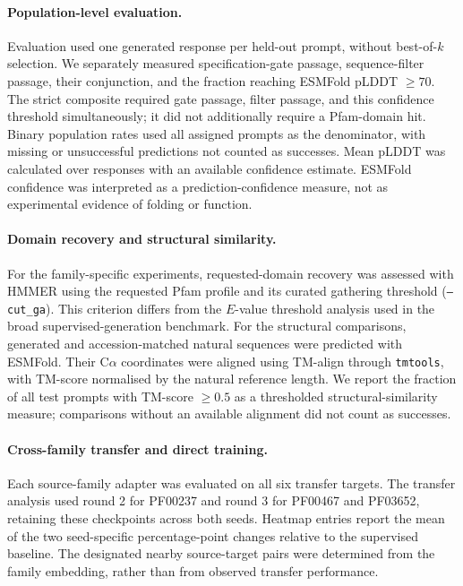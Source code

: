 \documentclass{article} %
\begin{document}
\paragraph{Population-level evaluation.}
Evaluation used one generated response per held-out prompt, without best-of-$k$ selection. We separately measured specification-gate passage, sequence-filter passage, their conjunction, and the fraction reaching ESMFold pLDDT $\geq70$. The strict composite required gate passage, filter passage, and this confidence threshold simultaneously; it did not additionally require a Pfam-domain hit. Binary population rates used all assigned prompts as the denominator, with missing or unsuccessful predictions not counted as successes. Mean pLDDT was calculated over responses with an available confidence estimate. ESMFold confidence was interpreted as a prediction-confidence measure, not as experimental evidence of folding or function.

\paragraph{Domain recovery and structural similarity.}
For the family-specific experiments, requested-domain recovery
was assessed with HMMER using the requested Pfam profile and
its curated gathering threshold (\texttt{--cut\_ga}).
This criterion differs from the $E$-value threshold analysis
used in the broad supervised-generation benchmark.
For the structural comparisons, generated and accession-matched
natural sequences were predicted with ESMFold. Their
C$\alpha$ coordinates were aligned using TM-align through
\texttt{tmtools}, with TM-score normalised by the natural
reference length. We report the fraction of all test prompts
with TM-score $\geq0.5$ as a thresholded structural-similarity
measure; comparisons without an available alignment did not
count as successes.

\paragraph{Cross-family transfer and direct training.}
Each source-family adapter was evaluated on all six transfer targets. The transfer analysis used round 2 for PF00237 and round 3 for PF00467 and PF03652, retaining these checkpoints across both seeds. Heatmap entries report the mean of the two seed-specific percentage-point changes relative to the supervised baseline. The designated nearby source-target pairs were determined from the family embedding, rather than from observed transfer performance.
\end{document}
